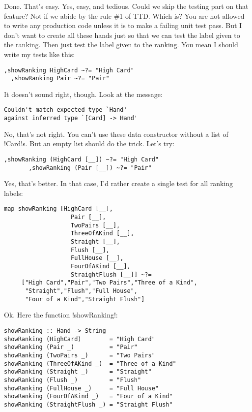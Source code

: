 \success Done. That's easy.
\lhN Yes, easy, and tedious. Could we skip the testing part on that feature?
\lhA Not if we abide by the rule \#1 of TTD.
\lhN Which is?
\lhA You are not allowed to write any production code unless it is to make a failing unit test pass.
\lhN But I don't want to create all these hands just so that we can test the label given to the ranking.
\lhA Then just test the label given to the ranking.
\lhN You mean I should write my tests like this:
\begin{lstlisting}[frame=single]
  ,showRanking HighCard ~?= "High Card"
  ,showRanking Pair ~?= "Pair"
\end{lstlisting}
It doesn't sound right, though. Look at the message:
\begin{small}
\begin{verbatim}
Couldn't match expected type `Hand'
against inferred type `[Card] -> Hand'
\end{verbatim}
\end{small}
\lhA \error No, that's not right. You can't use these data constructor without a list of \il!Card!s.
But an empty list should do the trick.
\lhN Let's try:
\begin{lstlisting}[frame=single]
       ,showRanking (HighCard [__]) ~?= "High Card"
       ,showRanking (Pair [__]) ~?= "Pair"
\end{lstlisting}
\lhA \success Yes, that's better.
\lhN In that case, I'd rather create a single test for all ranking labels:
\begin{lstlisting}[frame=single]
map showRanking [HighCard [__],
                   Pair [__],
                   TwoPairs [__],
                   ThreeOfAKind [__],
                   Straight [__],
                   Flush [__],
                   FullHouse [__],
                   FourOfAKind [__],
                   StraightFlush [__]] ~?=
     ["High Card","Pair","Two Pairs","Three of a Kind",
      "Straight","Flush","Full House",
      "Four of a Kind","Straight Flush"]
\end{lstlisting}
\lhA Ok. Here the function \il!showRanking!:
\begin{lstlisting}[frame=single]
showRanking :: Hand -> String
showRanking (HighCard)        = "High Card"
showRanking (Pair _)          = "Pair" 
showRanking (TwoPairs _)      = "Two Pairs" 
showRanking (ThreeOfAKind _)  = "Three of a Kind" 
showRanking (Straight _)      = "Straight" 
showRanking (Flush _)         = "Flush" 
showRanking (FullHouse _)     = "Full House" 
showRanking (FourOfAKind _)   = "Four of a Kind"
showRanking (StraightFlush _) = "Straight Flush"
\end{lstlisting}
